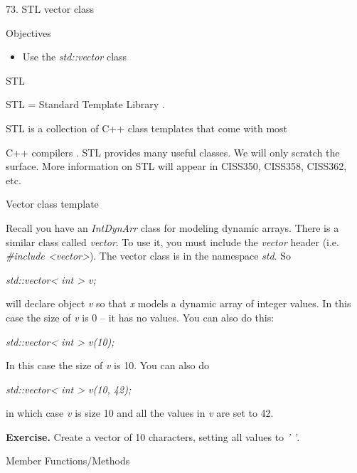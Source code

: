 \documentclass[
]{article}
\author{}
\date{}
\providecommand{\tightlist}{%
  \setlength{\itemsep}{0pt}\setlength{\parskip}{0pt}}
\begin{document}
73. STL vector class

Objectives

\begin{itemize}
\tightlist
\item
  Use the \emph{std::vector} class
\end{itemize}

STL

STL = Standard Template Library .

STL is a collection of C++ class templates that come with most

C++ compilers . STL provides many useful classes. We will only scratch
the surface. More information on STL will appear in CISS350, CISS358,
CISS362, etc.

Vector class template

Recall you have an \emph{IntDynArr} class for modeling dynamic arrays.
There is a similar class called \emph{vector}. To use it, you must
include the \emph{vector} header (i.e. \emph{\#include
\textless vector\textgreater{}}). The vector class is in the namespace
\emph{std}. So

\emph{std::vector\textless{} int \textgreater{} v;}

will declare object \emph{v} so that \emph{x} models a dynamic array of
integer values. In this case the size of \emph{v} is 0 -- it has no
values. You can also do this:

\emph{std::vector\textless{} int \textgreater{} v(10);}

In this case the size of \emph{v} is 10. You can also do

\emph{std::vector\textless{} int \textgreater{} v(10, 42);}

in which case \emph{v} is size 10 and all the values in \emph{v} are set
to 42.

\textbf{Exercise. }Create a vector of 10 characters, setting all values
to \emph{' '}.

Member Functions/Methods
\end{document}
